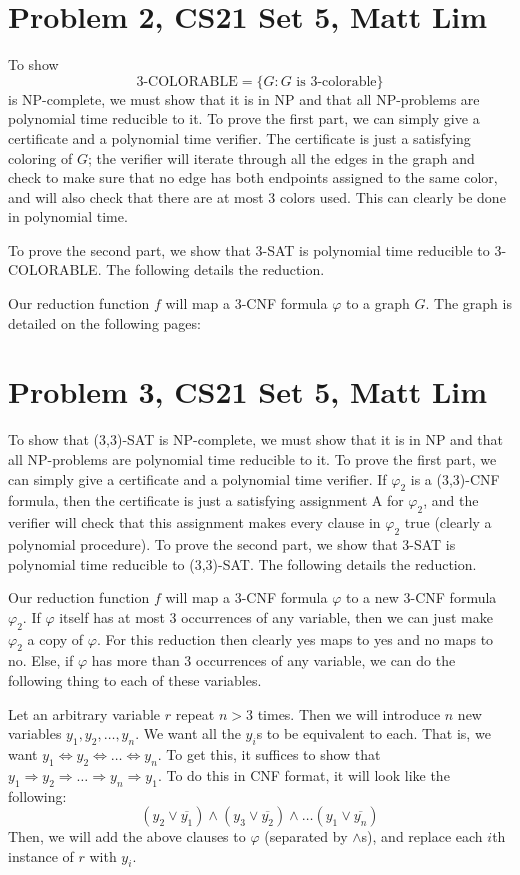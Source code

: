 \documentclass{article}
\begin{document}
\newpage

\section*{Problem 2, CS21 Set 5, Matt Lim}
To show
\[ \text{3-COLORABLE} = \{G : G \text{ is 3-colorable}\} \]
is NP-complete, we must show that it is in NP and that all NP-problems are
polynomial time reducible to it.  To prove the first part,
we can simply give a certificate and a polynomial time verifier. The certificate
is just a satisfying coloring of $G$; the verifier will iterate through all
the edges in the graph and check to make sure that no edge has both endpoints
assigned to the same color, and will also check that there are at most 3 colors
used. This can clearly be done in polynomial time.

To prove the second part, we show that 3-SAT is polynomial
time reducible to 3-COLORABLE. The following details the reduction.

Our reduction function $f$ will map a 3-CNF formula $\varphi$ to a graph $G$.
The graph is detailed on the following pages:
\newpage

\section*{Problem 3, CS21 Set 5, Matt Lim}
To show that (3,3)-SAT is NP-complete, we must show that it is in NP and that
all NP-problems are polynomial time reducible to it. To prove the first part,
we can simply give a certificate and a polynomial time verifier. If
$\varphi_{2}$ is a (3,3)-CNF formula, then the certificate is just a
satisfying assignment A for $\varphi_{2}$, and the verifier will check that
this assignment makes every clause in $\varphi_{2}$ true (clearly a polynomial
procedure).  To prove the second
part, we show that 3-SAT is polynomial time reducible to (3,3)-SAT. The
following details the reduction.

Our reduction function $f$ will map a 3-CNF formula $\varphi$ to a new 3-CNF
formula $\varphi_{2}$. If $\varphi$ itself has at most 3 occurrences of any
variable, then we can just make $\varphi_{2}$ a copy of $\varphi$. For this
reduction then clearly yes maps to yes and no maps to no. Else, if
$\varphi$ has more than 3 occurrences of any variable, we can do the following
thing to each of these variables.

Let an arbitrary variable $r$ repeat $n > 3$ times. Then we will introduce
$n$ new variables $y_{1}, y_{2}, \dots , y_{n}$. We want all the $y_{i}$s to
be equivalent to each. That is, we want $y_{1} \Leftrightarrow y_{2}
\Leftrightarrow \dots \Leftrightarrow y_{n}$. To get this, it suffices to show
that $y_{1} \Rightarrow y_{2} \Rightarrow \dots \Rightarrow y_{n} \Rightarrow
y_{1}$. To do this in CNF format, it will look like the following:
\[ (y_{2} \vee \overline{y_{1}}) \wedge (y_{3} \vee \overline{y_{2}})
\wedge \dots (y_{1} \vee \overline{y_{n}}) \]
Then, we will add the above clauses to $\varphi$ (separated by $\wedge$s), and
replace each $i$th instance of $r$ with $y_{i}$.
\end{document}
